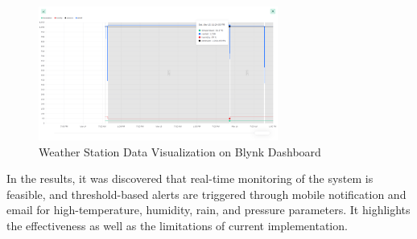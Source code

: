 \documentclass[conference, onecolumn]{IEEEtran}
\begin{document}
\begin{figure}[H]
    \centering
    \includegraphics[width=0.7\textwidth]{figures/Screenshot (200).png}
    \caption{Weather Station Data Visualization on Blynk Dashboard}
    \label{fig:collected_data}
\end{figure}

In the results, it was discovered that real-time monitoring of the system is feasible, and threshold-based alerts are triggered through mobile notification and email for high-temperature, humidity, rain, and pressure parameters. It highlights the effectiveness as well as the limitations of current implementation.
\end{document}
